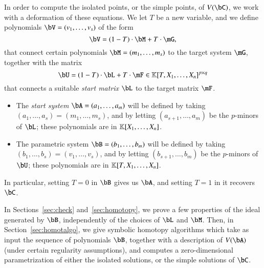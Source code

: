 In order to compute the isolated points, or the simple points, of
$V(\bC)$, we work with a deformation of these equations.  We let $T$ be a
new variable, and we define 
polynomials $\bV=(v_1,\dots,v_s)$ of the form
\begin{equation}\label{eqdef:bV}
\bV = (1-T) \cdot \bM + T \cdot \mG,  
\end{equation}
that connect certain polynomials $\bM=(m_1,\dots,m_s)$ to the target
system $\mG$, together with 
the matrix
\begin{equation}\label{eqdef:bU}
\bU = (1-T)\cdot \bL + T \cdot \mF \in \KK[T, X_1,\dots,X_n]^{p \times q}  
\end{equation}
that connects a suitable \emph{start matrix} $\bL$ to the target matrix $\mF$.
\begin{itemize}
\item The {\em start system} $\bA=(a_1,\dots,a_m)$ will be defined by
  taking $(a_1,\dots,a_s) = (m_1,\dots,m_s)$, and by letting
  $(a_{s+1},\dots,a_m)$ be the $p$-minors of $\bL$; these polynomials 
  are in $\mathbb{K}[X_1,\dots,X_n]$. 
\item The parametric system $\bB=(b_1,\dots,b_m)$ will be defined by
  taking $(b_1,\dots,b_s) = (v_1,\dots,v_s)$, and by letting
  $(b_{s+1},\dots,b_m)$ be the $p$-minors of $\bU$; these polynomials 
  are in $\mathbb{K}[T,X_1,\dots,X_n]$. 
\end{itemize}
In particular, setting $T=0$ in $\bB$ gives us $\bA$, and 
setting $T=1$ in it recovers $\bC$.

In Sections~\ref{sec:check} and~\ref{sec:homotopy}, we prove a few
properties of the ideal generated by $\bB$, independently of the
choices of $\bL$ and $\bM$.  Then, in Section~\ref{sec:homotalgo}, we
give symbolic homotopy algorithms which take as input the sequence of
polynomials $\bB$, together with a description of $V(\bA)$ (under
certain regularity assumptions), and computes a zero-dimensional
parametrization of either the isolated solutions, or the simple
solutions of $\bC$. %

